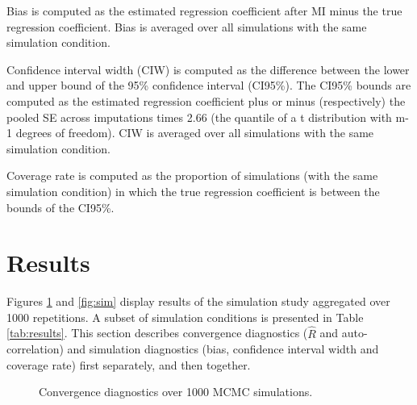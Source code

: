 \documentclass[article]{jss}
\begin{document}
Bias is computed as the estimated regression coefficient after MI minus the true regression coefficient. Bias is averaged over all simulations with the same simulation condition.

Confidence interval width (CIW) is computed as the difference between the lower and upper bound of the 95\% confidence interval (CI95\%). The CI95\% bounds are computed as the estimated regression coefficient plus or minus (respectively) the pooled SE across imputations times 2.66 (the quantile of a t distribution with m-1 degrees of freedom). CIW is averaged over all simulations with the same simulation condition.

Coverage rate is computed as the proportion of simulations (with the same simulation condition) in which the true regression coefficient is between the bounds of the CI95\%. 





\section{Results}


Figures \ref{fig:conv} and \ref{fig:sim} display results of the simulation study aggregated over 1000 repetitions. A subset of simulation conditions is presented in Table \ref{tab:results}. This section describes convergence diagnostics ($\widehat{R}$ and auto-correlation) and simulation diagnostics (bias, confidence interval width and coverage rate) first separately, and then together.

\begin{figure}[h]
  \caption{Convergence diagnostics over 1000 MCMC simulations.}
    \label{fig:conv}
\end{figure}
\end{document}
